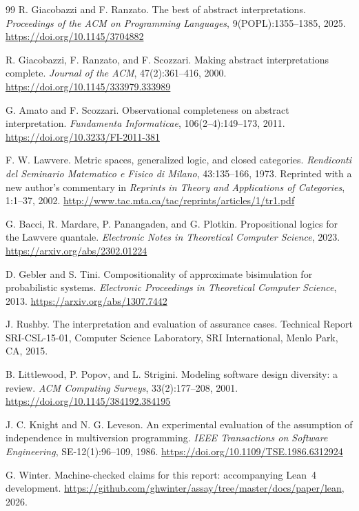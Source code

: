 \begin{thebibliography}{99}
R. Giacobazzi and F. Ranzato.
\newblock The best of abstract interpretations.
\newblock \emph{Proceedings of the ACM on Programming Languages},
9(POPL):1355--1385, 2025.
\newblock \url{https://doi.org/10.1145/3704882}

R. Giacobazzi, F. Ranzato, and F. Scozzari.
\newblock Making abstract interpretations complete.
\newblock \emph{Journal of the ACM}, 47(2):361--416, 2000.
\newblock \url{https://doi.org/10.1145/333979.333989}

G. Amato and F. Scozzari.
\newblock Observational completeness on abstract interpretation.
\newblock \emph{Fundamenta Informaticae}, 106(2--4):149--173, 2011.
\newblock \url{https://doi.org/10.3233/FI-2011-381}

F. W. Lawvere.
\newblock Metric spaces, generalized logic, and closed categories.
\newblock \emph{Rendiconti del Seminario Matematico e Fisico di Milano},
43:135--166, 1973.
\newblock Reprinted with a new author's commentary in \emph{Reprints in Theory
and Applications of Categories}, 1:1--37, 2002.
\newblock \url{http://www.tac.mta.ca/tac/reprints/articles/1/tr1.pdf}

G. Bacci, R. Mardare, P. Panangaden, and G. Plotkin.
\newblock Propositional logics for the Lawvere quantale.
\newblock \emph{Electronic Notes in Theoretical Computer Science}, 2023.
\newblock \url{https://arxiv.org/abs/2302.01224}

D. Gebler and S. Tini.
\newblock Compositionality of approximate bisimulation for probabilistic
systems.
\newblock \emph{Electronic Proceedings in Theoretical Computer Science}, 2013.
\newblock \url{https://arxiv.org/abs/1307.7442}

J. Rushby.
\newblock The interpretation and evaluation of assurance cases.
\newblock Technical Report SRI-CSL-15-01, Computer Science Laboratory, SRI
International, Menlo Park, CA, 2015.

B. Littlewood, P. Popov, and L. Strigini.
\newblock Modeling software design diversity: a review.
\newblock \emph{ACM Computing Surveys}, 33(2):177--208, 2001.
\newblock \url{https://doi.org/10.1145/384192.384195}

J. C. Knight and N. G. Leveson.
\newblock An experimental evaluation of the assumption of independence in
multiversion programming.
\newblock \emph{IEEE Transactions on Software Engineering}, SE-12(1):96--109,
1986.
\newblock \url{https://doi.org/10.1109/TSE.1986.6312924}

G. Winter.
\newblock Machine-checked claims for this report: accompanying Lean~4
development.
\newblock \url{https://github.com/ghwinter/assay/tree/master/docs/paper/lean},
2026.

\end{thebibliography}
